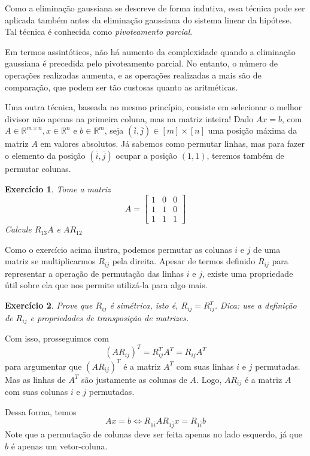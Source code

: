 \documentclass[]{article}
\newtheorem{exercicio}{Exercício}
\numberwithin{equation}{section}
\begin{document}
Como a eliminação gaussiana se descreve de forma indutiva, essa técnica pode ser aplicada também antes da eliminação gaussiana do sistema linear da hipótese. Tal técnica é conhecida como \emph{pivoteamento parcial}.

Em termos assintóticos, não há aumento da complexidade quando a eliminação gaussiana é precedida pelo pivoteamento parcial. No entanto, o  número de operações realizadas aumenta, e as operações realizadas a mais são de comparação, que podem ser tão custosas quanto as aritméticas.

Uma outra técnica, baseada no mesmo princípio, consiste em selecionar o melhor divisor não apenas na primeira coluna, mas na matriz inteira! Dado $Ax = b$, com $A \in \mathbb{R}^{m \times n}, x \in \mathbb{R}^n$ e $b \in \mathbb{R}^m$, seja $(\overline{i}, \overline{j}) \in [m] \times [n]$ uma posição máxima da matriz $A$ em valores absolutos. Já sabemos como permutar linhas, mas para fazer o elemento da posição $(\overline{i}, \overline{j})$ ocupar a posição $(1, 1)$, teremos também de permutar colunas.

\begin{exercicio}
	Tome a matriz
	$$
	A =
	\begin{bmatrix}
	1 & 0 & 0 \\
	1 & 1 & 0 \\
	1 & 1 & 1
	\end{bmatrix}
	$$
	Calcule $R_{13}A$ e $AR_{12}$
\end{exercicio}

Como o exercício acima ilustra, podemos permutar as colunas $i$ e $j$ de uma matriz se multiplicarmos $R_{ij}$ pela direita. Apesar de termos definido $R_{ij}$ para representar a operação de permutação das linhas $i$ e $j$, existe uma propriedade útil sobre ela que nos permite utilizá-la para algo mais.

\begin{exercicio}
	Prove que $R_{ij}$ é simétrica, isto é, $R_{ij} = R_{ij}^T$. Dica: use a definição de $R_{ij}$ e propriedades de transposição de matrizes.
\end{exercicio}

Com isso, prosseguimos com
$$
(A R_{ij})^T = R_{ij}^TA^T = R_{ij}A^T
$$
para argumentar que $(A R_{ij})^T$ é a matriz $A^T$ com suas linhas $i$ e $j$ permutadas. Mas as linhas de $A^T$ são justamente as colunas de $A$. Logo, $A R_{ij}$ é a matriz $A$ com suas colunas $i$ e $j$ permutadas.

Dessa forma, temos
$$
Ax = b \iff R_{1\overline{i}} A R_{1\overline{j}} x = R_{1\overline{i}}b
$$
Note que a permutação de colunas deve ser feita apenas no lado esquerdo, já que $b$ é apenas um vetor-coluna.
\end{document}
